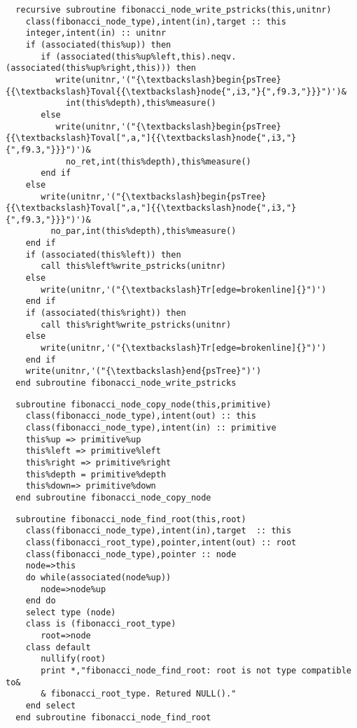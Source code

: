 \begin{Verbatim}
  recursive subroutine fibonacci_node_write_pstricks(this,unitnr)
    class(fibonacci_node_type),intent(in),target :: this
    integer,intent(in) :: unitnr
    if (associated(this%up)) then
       if (associated(this%up%left,this).neqv.(associated(this%up%right,this))) then
          write(unitnr,'("{\textbackslash}begin{psTree}{{\textbackslash}Toval{{\textbackslash}node{",i3,"}{",f9.3,"}}}")')&
            int(this%depth),this%measure()
       else
          write(unitnr,'("{\textbackslash}begin{psTree}{{\textbackslash}Toval[",a,"]{{\textbackslash}node{",i3,"}{",f9.3,"}}}")')&
            no_ret,int(this%depth),this%measure()
       end if
    else
       write(unitnr,'("{\textbackslash}begin{psTree}{{\textbackslash}Toval[",a,"]{{\textbackslash}node{",i3,"}{",f9.3,"}}}")')&
         no_par,int(this%depth),this%measure()
    end if
    if (associated(this%left)) then
       call this%left%write_pstricks(unitnr)
    else
       write(unitnr,'("{\textbackslash}Tr[edge=brokenline]{}")')
    end if
    if (associated(this%right)) then
       call this%right%write_pstricks(unitnr)
    else
       write(unitnr,'("{\textbackslash}Tr[edge=brokenline]{}")')
    end if
    write(unitnr,'("{\textbackslash}end{psTree}")')
  end subroutine fibonacci_node_write_pstricks
\end{Verbatim}

\begin{Verbatim}
  subroutine fibonacci_node_copy_node(this,primitive)
    class(fibonacci_node_type),intent(out) :: this
    class(fibonacci_node_type),intent(in) :: primitive
    this%up => primitive%up
    this%left => primitive%left
    this%right => primitive%right
    this%depth = primitive%depth
    this%down=> primitive%down
  end subroutine fibonacci_node_copy_node
\end{Verbatim}

\begin{Verbatim}
  subroutine fibonacci_node_find_root(this,root)
    class(fibonacci_node_type),intent(in),target  :: this
    class(fibonacci_root_type),pointer,intent(out) :: root
    class(fibonacci_node_type),pointer :: node
    node=>this
    do while(associated(node%up))
       node=>node%up
    end do
    select type (node)
    class is (fibonacci_root_type)
       root=>node
    class default
       nullify(root)
       print *,"fibonacci_node_find_root: root is not type compatible to&
       & fibonacci_root_type. Retured NULL()."
    end select
  end subroutine fibonacci_node_find_root
\end{Verbatim}

